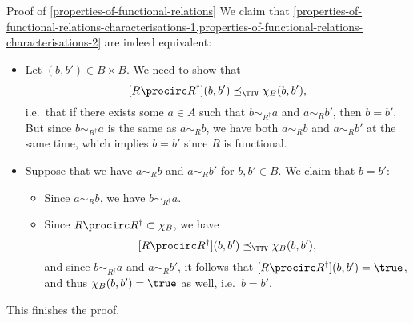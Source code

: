 \begin{Proof}{Proof of \cref{properties-of-functional-relations}}%
    We claim that \cref{properties-of-functional-relations-characterisations-1,properties-of-functional-relations-characterisations-2} are indeed equivalent:
    \begin{itemize}
        \item{}Let $(b,b')\in B\times B$. We need to show that
            \[
                [R\procirc R^{\dagger}](b,b')%
                \preceq_{\TTV}%
                \chi_{B}(b,b'),%
            \]%
            i.e.\ that if there exists some $a\in A$ such that $b\sim_{R^{\dagger}}a$ and $a\sim_{R}b'$, then $b=b'$. But since $b\sim_{R^{\dagger}}a$ is the same as $a\sim_{R}b$, we have both $a\sim_{R}b$ and $a\sim_{R}b'$ at the same time, which implies $b=b'$ since $R$ is functional.
        \item{}Suppose that we have $a\sim_{R}b$ and $a\sim_{R}b'$ for $b,b'\in B$. We claim that $b=b'$:
            \begin{itemize}
                \item Since $a\sim_{R}b$, we have $b\sim_{R^{\dagger}}a$.
                \item Since $R\procirc R^{\dagger}\subset\chi_{B}$, we have
                    \[
                        [R\procirc R^{\dagger}](b,b')%
                        \preceq_{\TTV}%
                        \chi_{B}(b,b'),%
                    \]%
                    and since $b\sim_{R^{\dagger}}a$ and $a\sim_{R}b'$, it follows that $[R\procirc R^{\dagger}](b,b')=\true$, and thus $\chi_{B}(b,b')=\true$ as well, i.e.\ $b=b'$.
            \end{itemize}
    \end{itemize}
    This finishes the proof.
\end{Proof}
